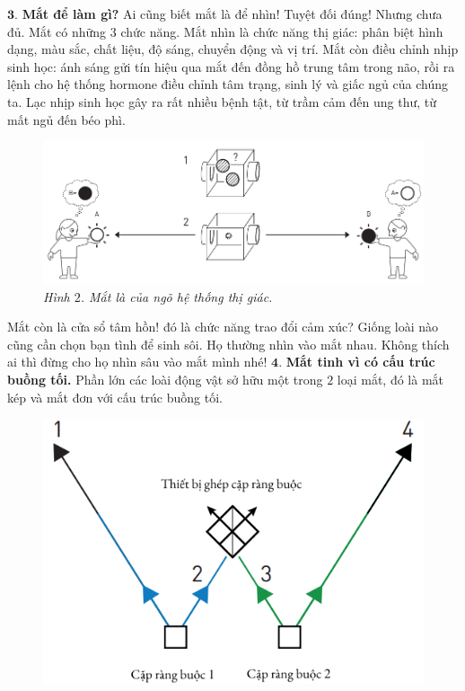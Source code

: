 \begin{multicols}{2}
	\vskip 0.1cm
	$\pmb{3.}$	\textbf{\color{timhieukhoahoc}Mắt để làm gì?}
	\vskip 0.1cm
	Ai cũng biết mắt là để nhìn! Tuyệt đối đúng! Nhưng chưa đủ. Mắt có những $3$ chức năng.  
	\vskip 0.1cm
	Mắt nhìn là chức năng thị giác: phân biệt hình dạng, màu sắc, chất liệu, độ sáng, chuyển động và vị trí. Mắt còn điều chỉnh nhịp sinh học: ánh sáng gửi tín hiệu qua mắt đến đồng hồ trung tâm trong não, rồi ra lệnh cho hệ thống hormone điều chỉnh tâm trạng, sinh lý và giấc ngủ của chúng ta. Lạc nhịp sinh học gây ra rất nhiều bệnh tật, từ trầm cảm đến ung thư, từ mất ngủ đến béo phì. 
	\begin{figure}[H]
		\vspace*{-5pt}
		\centering
		\captionsetup{labelformat= empty, justification=centering}
		\includegraphics[width= 1\linewidth]{2}
		\caption{\small\textit{\color{timhieukhoahoc}Hình $2$. Mắt là của ngõ hệ thống thị giác.}}
		\vspace*{-10pt}
	\end{figure}
	Mắt còn là cửa sổ tâm hồn! đó là chức năng trao đổi cảm xúc? Giống loài nào cũng cần chọn bạn tình để sinh sôi. Họ thường nhìn vào mắt nhau. Không thích ai thì đừng cho họ nhìn sâu vào mắt mình nhé!
	\vskip 0.1cm
	$\pmb{4.}$ \textbf{\color{timhieukhoahoc}Mắt tinh vì có cấu trúc buồng tối.}
	\vskip 0.1cm
	Phần lớn các loài động vật sở hữu một trong $2$ loại mắt, đó là mắt kép và mắt đơn với cấu trúc buồng tối. 
	\begin{figure}[H]
		\vspace*{-5pt}
		\centering
		\captionsetup{labelformat= empty, justification=centering}
		\includegraphics[width= 0.8\linewidth]{3}

\end{figure}
\end{multicols}

